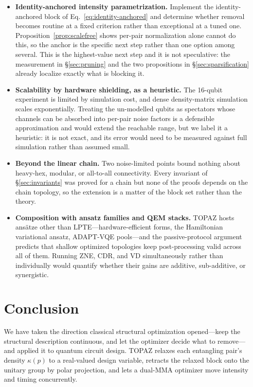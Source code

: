 \documentclass[twocolumn,aps,prl,superscriptaddress,showkeys]{revtex4-2}
\theoremstyle{plain}
\theoremstyle{definition}
\begin{document}
\begin{itemize}
\item \textbf{Identity-anchored intensity parametrization.} Implement the identity-anchored block of Eq.~\eqref{eq:identity-anchored} and determine whether removal becomes routine at a fixed criterion rather than exceptional at a tuned one. Proposition~\ref{prop:scalefree} shows per-pair normalization alone cannot do this, so the anchor is the specific next step rather than one option among several. This is the highest-value next step and it is not speculative: the measurement in \S\ref{sec:pruning} and the two propositions in \S\ref{sec:sparsification} already localize exactly what is blocking it.
\item \textbf{Scalability by hardware shielding, as a heuristic.} The 16-qubit experiment is limited by simulation cost, and dense density-matrix simulation scales exponentially. Treating the un-modelled qubits as spectators whose channels can be absorbed into per-pair noise factors is a defensible approximation and would extend the reachable range, but we label it a heuristic: it is not exact, and its error would need to be measured against full simulation rather than assumed small.
\item \textbf{Beyond the linear chain.} Two noise-limited points bound nothing about heavy-hex, modular, or all-to-all connectivity. Every invariant of \S\ref{sec:invariants} was proved for a chain but none of the proofs depends on the chain topology, so the extension is a matter of the block set rather than the theory.
\item \textbf{Composition with ansatz families and QEM stacks.} TOPAZ hosts ans\"atze other than LPTE---hardware-efficient forms, the Hamiltonian variational ansatz, ADAPT-VQE pools---and the passive-protocol argument predicts that shallow optimized topologies keep post-processing valid across all of them. Running ZNE, CDR, and VD simultaneously rather than individually would quantify whether their gains are additive, sub-additive, or synergistic.
\end{itemize}

\section{Conclusion}
\label{sec:conclusion}

We have taken the direction classical structural optimization opened---keep the structural description continuous, and let the optimizer decide what to remove---and applied it to quantum circuit design. TOPAZ relaxes each entangling pair's density $\kappa(p)$ to a real-valued design variable, retracts the relaxed block onto the unitary group by polar projection, and lets a dual-MMA optimizer move intensity and timing concurrently.
\end{document}
